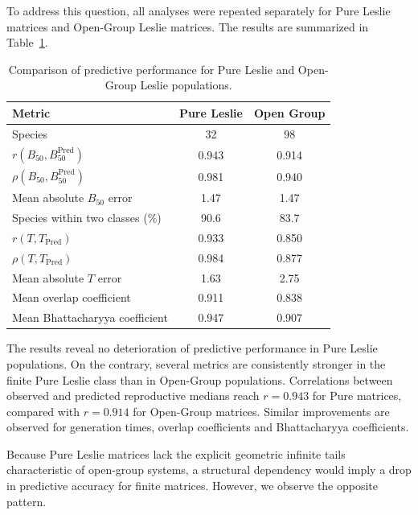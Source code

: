 \documentclass[10pt,a4paper]{amsart}
\theoremstyle{definition}
\theoremstyle{remark}
\numberwithin{equation}{section}
\begin{document}
To address this question, all analyses were repeated separately for Pure Leslie matrices and Open-Group Leslie matrices. The results are summarized in Table~\ref{tab:PureOpenComparison}.

\begin{table}[t]
	\centering
	\caption{Comparison of predictive performance for Pure Leslie and Open-Group Leslie populations.}
	\label{tab:PureOpenComparison}
	\begin{tabular}{lcc}
		\hline
		Metric & Pure Leslie & Open Group \\
		\hline
		Species & 32 & 98 \\
		$r(B_{50},B_{50}^{\mathrm{Pred}})$ & 0.943 & 0.914 \\
		$\rho(B_{50},B_{50}^{\mathrm{Pred}})$ & 0.981 & 0.940 \\
		Mean absolute $B_{50}$ error & 1.47 & 1.47 \\
		Species within two classes (\%) & 90.6 & 83.7 \\
		$r(T,T_{\mathrm{Pred}})$ & 0.933 & 0.850 \\
		$\rho(T,T_{\mathrm{Pred}})$ & 0.984 & 0.877 \\
		Mean absolute $T$ error & 1.63 & 2.75 \\
		Mean overlap coefficient & 0.911 & 0.838 \\
		Mean Bhattacharyya coefficient & 0.947 & 0.907 \\
		\hline
	\end{tabular}
\end{table}

The results reveal no deterioration of predictive performance in Pure Leslie populations. On the contrary, several metrics are consistently stronger in the finite Pure Leslie class than in Open-Group populations. Correlations between observed and predicted reproductive medians reach $r=0.943$ for Pure matrices, compared with $r=0.914$ for Open-Group matrices. Similar improvements are observed for generation times, overlap coefficients and Bhattacharyya coefficients.




Because Pure Leslie matrices lack the explicit geometric infinite tails characteristic of open-group systems, a structural dependency would imply a drop in predictive accuracy for finite matrices. However, we observe the opposite pattern.




\end{document}
